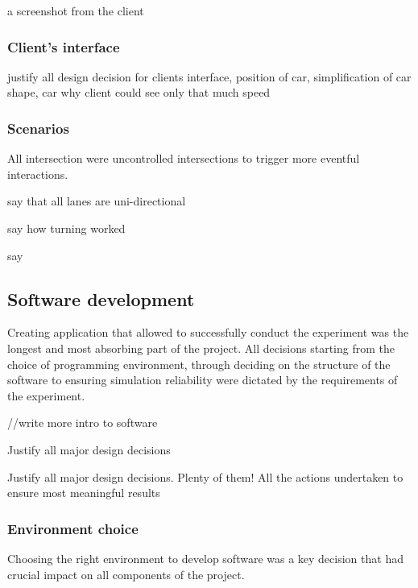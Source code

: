 \documentclass[11pt]{article}
\begin{document}
a screenshot from the client



\subsubsection{Client's interface}

justify all design decision for clients interface, position of car,
simplification of car shape,
car why client could see only that much
speed



\subsubsection{Scenarios}


All intersection were uncontrolled intersections to trigger more eventful interactions. 

say that all lanes are uni-directional

say how turning worked

say 


\subsection{Software development}

Creating application that allowed to successfully conduct the experiment was the longest and most absorbing part of the project. All decisions starting from the choice of programming environment, through deciding on the structure of the software to ensuring simulation reliability were dictated by the requirements of the experiment.



//write more intro to software







Justify all major design decisions

Justify all major design decisions. Plenty of them!
All the actions undertaken to ensure most meaningful results


\subsubsection{Environment choice}

Choosing the right environment to develop software was a key decision that had crucial impact on all components of the project. 
\end{document}
